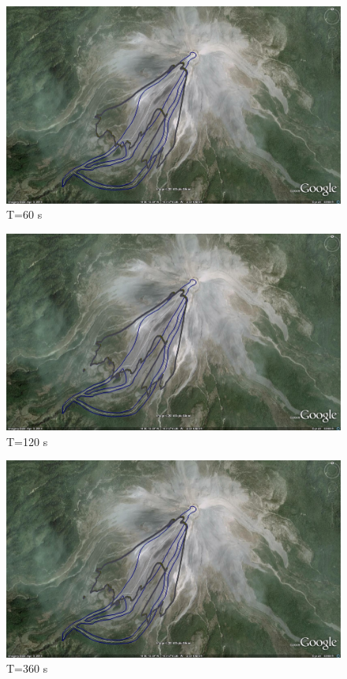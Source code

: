 \documentclass[letterpaper,10pt]{article}
\begin{document}
\begin{figure}[H]
\centerline{\includegraphics[width=.9\textwidth]{IMAGES/pics/level6.jpg}}
\caption{T=60 s}
\label{level06}
\end{figure}
\begin{figure}[H]
\centerline{\includegraphics[width=.9\textwidth]{IMAGES/pics/level12.jpg}}
\caption{T=120 s}
\label{level12}
\end{figure}
\begin{figure}[H]
\centerline{\includegraphics[width=.9\textwidth]{IMAGES/pics/level36.jpg}}
\caption{T=360 s}
\label{level36}
\end{figure}
\end{document}
